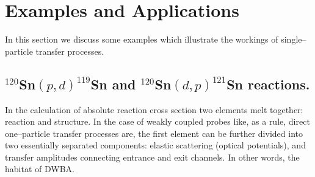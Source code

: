 \section{Examples and Applications}\label{C6S2}
In this section we discuss some examples which illustrate the workings of single--particle transfer processes. 
  \subsection{$^{120}$Sn$(p,d)^{119}$Sn and $^{120}$Sn$(d,p)^{121}$Sn reactions.}\label{C6S2.1}
  In the calculation of absolute reaction cross section two elements melt together: reaction and structure.
  In the case of weakly coupled probes like, as a rule, direct one--particle transfer processes are, the first element can be further divided into two essentially separated components: elastic scattering (optical potentials), and transfer amplitudes connecting entrance and exit channels. In other words, the habitat of DWBA.
  
